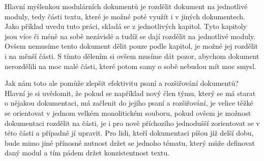 Hlavní myšlenkou modulárních dokumentů je rozdělit dokument na jednotlivé moduly, tedy části textu, které je možné poté využít i v jiných dokumentech. Jako příklad uvedu
tuto práci, skladá se z jednotlivých kapitol. Tyto kapitoly jsou více či méně na sobě nezávislé a tudíž se dají rozdělit na jednotlivé moduly. Ovšem nemusíme tento
dokument dělit pouze podle kapitol, je možné jej rozdělit i na měnší části. S tímto dělením si ovšem musíme dát pozor, abychom dokument nerozdělili na moc malé části,
které potom samy o sobě nebudou mít moc smysl.

Jak nám toto ale pomůže zlepšit efektivitu psaní a rozšiřování dokumentů? Hlavní je si uvědomit, že pokud se například nový člen týmu, který se má starat o nějakou
dokumentaci, má začlenit do jejího psaní a rozšiřování, je velice těžké se orientovat v jednom velkém monolitickém souboru, pokud ovšem je možnost dokumentaci rozdělit
na části, je i pro nově příchozího jednodušší zorientovat se v této části a případně jí upravit. Pro lidi, kteří dokumentaci píšou již delší dobu, bude mimo jiné přínosné
nutnost držet se jednoho tématu, který může definovat daný modul a tím pádem držet konzistentnost textu. \cite{modularDocuments}
